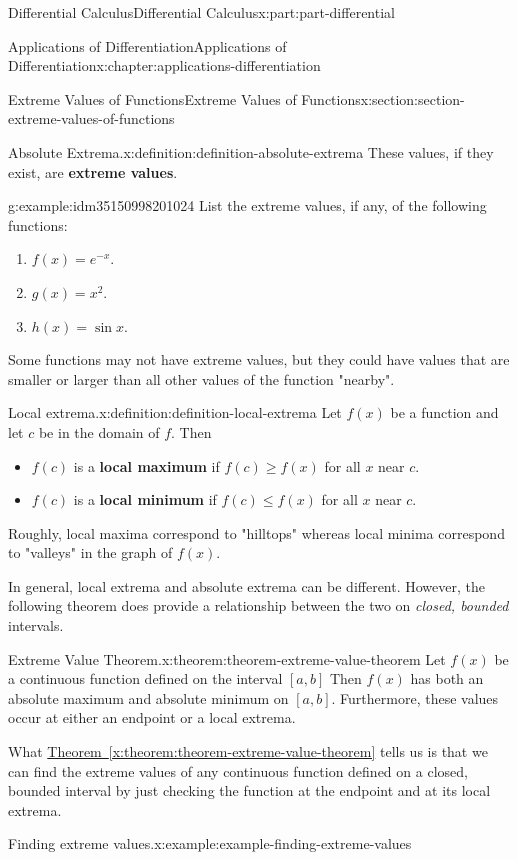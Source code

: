 \documentclass[twoside,10pt,]{book}
\newcommand{\xreffont}{\relax}
\newcommand{\terminology}[1]{\textbf{#1}}
\numberwithin{equation}{part}
\begin{document}
\begin{partptx}{Differential Calculus}{}{Differential Calculus}{}{}{x:part:part-differential}
\begin{chapterptx}{Applications of Differentiation}{}{Applications of Differentiation}{}{}{x:chapter:applications-differentiation}
\begin{sectionptx}{Extreme Values of Functions}{}{Extreme Values of Functions}{}{}{x:section:section-extreme-values-of-functions}
\begin{definition}{Absolute Extrema.}{x:definition:definition-absolute-extrema}
These values, if they exist, are \terminology{extreme values}.%
\end{definition}
\begin{example}{}{g:example:idm35150998201024}%
List the extreme values, if any, of the following functions:%
\begin{enumerate}
\item{}\(f(x) = e^{-x}\).%
\item{}\(g(x) = x^{2}\).%
\item{}\(h(x) = \sin x\).%
\end{enumerate}
%
\end{example}
Some functions may not have extreme values, but they could have values that are smaller or larger than all other values of the function "nearby".%
\begin{definition}{Local extrema.}{x:definition:definition-local-extrema}%
%
Let \(f(x)\) be a function and let \(c\) be in the domain of \(f\). Then%
\begin{itemize}[label=\textbullet]
\item{}\(f(c)\) is a \terminology{local maximum} if \(f(c)\geq f(x)\) for all \(x\) near \(c\).%
\item{}\(f(c)\) is a \terminology{local minimum} if \(f(c)\leq f(x)\) for all \(x\) near \(c\).%
\end{itemize}
Roughly, local maxima correspond to "hilltops" whereas local minima correspond to "valleys" in the graph of \(f(x)\).%
\end{definition}
In general, local extrema and absolute extrema can be different. However, the following theorem does provide a relationship between the two on \emph{closed, bounded} intervals.%
\begin{theorem}{Extreme Value Theorem.}{}{x:theorem:theorem-extreme-value-theorem}%
%
Let \(f(x)\) be a continuous function defined on the interval \([a,b]\) Then \(f(x)\) has both an absolute maximum and absolute minimum on \([a,b]\). Furthermore, these values occur at either an endpoint or a local extrema.%
\end{theorem}
What \hyperref[x:theorem:theorem-extreme-value-theorem]{Theorem~{\xreffont\ref{x:theorem:theorem-extreme-value-theorem}}} tells us is that we can find the extreme values of any continuous function defined on a closed, bounded interval by just checking the function at the endpoint and at its local extrema.%
\begin{example}{Finding extreme values.}{x:example:example-finding-extreme-values}%

\end{example}
\end{sectionptx}
\end{chapterptx}
\end{partptx}
\end{document}
